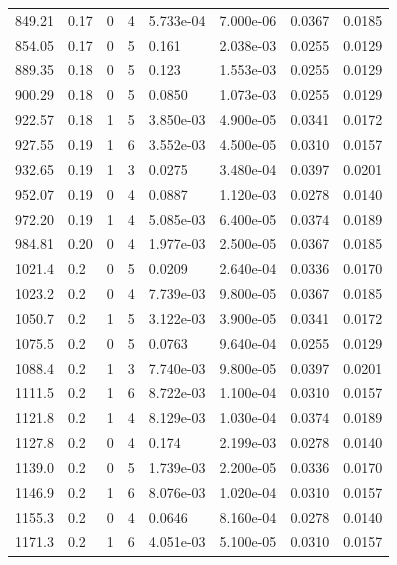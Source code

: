 \documentclass[preview]{standalone}
\begin{document}
{{{\begin{tabular}{L{1.2cm}C{1.2cm} C{0.3cm}C{0.5cm} C{1.4cm}C{1.4cm} C{1.4cm}C{1.4cm}}
  849.21  &  0.17  & 0     &  4 &  5.733e-04  & 7.000e-06  & 0.0367 &  0.0185   \\ 
  854.05  &  0.17  & 0     &  5 &  0.161  & 2.038e-03  & 0.0255 &  0.0129   \\ 
  889.35  &  0.18  & 0     &  5 &  0.123  & 1.553e-03  & 0.0255 &  0.0129   \\ 
  900.29  &  0.18  & 0     &  5 &  0.0850  & 1.073e-03  & 0.0255 &  0.0129   \\ 
  922.57  &  0.18  & 1     &  5 &  3.850e-03  & 4.900e-05  & 0.0341 &  0.0172   \\ 
  927.55  &  0.19  & 1     &  6 &  3.552e-03  & 4.500e-05  & 0.0310 &  0.0157   \\ 
  932.65  &  0.19  & 1     &  3 &  0.0275  & 3.480e-04  & 0.0397 &  0.0201   \\ 
  952.07  &  0.19  & 0     &  4 &  0.0887  & 1.120e-03  & 0.0278 &  0.0140   \\ 
  972.20  &  0.19  & 1     &  4 &  5.085e-03  & 6.400e-05  & 0.0374 &  0.0189   \\ 
  984.81  &  0.20  & 0     &  4 &  1.977e-03  & 2.500e-05  & 0.0367 &  0.0185   \\ 
  1021.4  &   0.2  & 0     &  5 &  0.0209  & 2.640e-04  & 0.0336 &  0.0170   \\ 
  1023.2  &   0.2  & 0     &  4 &  7.739e-03  & 9.800e-05  & 0.0367 &  0.0185   \\ 
  1050.7  &   0.2  & 1     &  5 &  3.122e-03  & 3.900e-05  & 0.0341 &  0.0172   \\ 
  1075.5  &   0.2  & 0     &  5 &  0.0763  & 9.640e-04  & 0.0255 &  0.0129   \\ 
  1088.4  &   0.2  & 1     &  3 &  7.740e-03  & 9.800e-05  & 0.0397 &  0.0201   \\ 
  1111.5  &   0.2  & 1     &  6 &  8.722e-03  & 1.100e-04  & 0.0310 &  0.0157   \\ 
  1121.8  &   0.2  & 1     &  4 &  8.129e-03  & 1.030e-04  & 0.0374 &  0.0189   \\ 
  1127.8  &   0.2  & 0     &  4 &  0.174  & 2.199e-03  & 0.0278 &  0.0140   \\ 
  1139.0  &   0.2  & 0     &  5 &  1.739e-03  & 2.200e-05  & 0.0336 &  0.0170   \\ 
  1146.9  &   0.2  & 1     &  6 &  8.076e-03  & 1.020e-04  & 0.0310 &  0.0157   \\ 
  1155.3  &   0.2  & 0     &  4 &  0.0646  & 8.160e-04  & 0.0278 &  0.0140   \\ 
  1171.3  &   0.2  & 1     &  6 &  4.051e-03  & 5.100e-05  & 0.0310 &  0.0157   \\ 

\end{tabular}}}}
\end{document}
